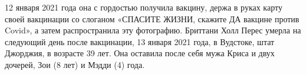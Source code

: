 12 января 2021 года она с гордостью получила вакцину, держа в руках карту своей
вакцинации со слоганом «СПАСИТЕ ЖИЗНИ, скажите ДА вакцине против Covid», а затем
распространила эту фотографию. Бриттани Холл Перес умерла на следующий день
после вакцинации, 13 января 2021 года, в Вудстоке, штат Джорджия, в возрасте 39
лет. Она оставила после себя мужа Криса и двух дочерей, Зои (8 лет) и Мэдди (4)
года.

